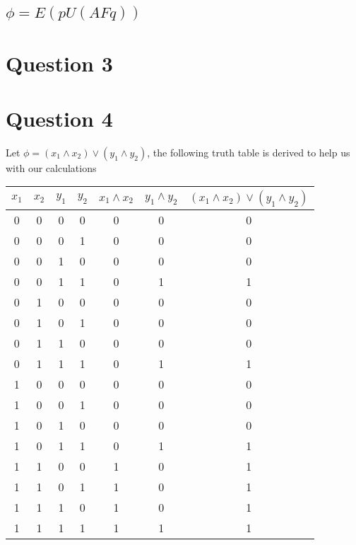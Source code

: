 \documentclass[a4paper,10pt]{article}
\begin{document}
\subsection*{$\phi = E(pU(AFq))$}






\newpage
\section*{Question 3}
\newpage
\section*{Question 4}
Let $\phi = (x_1 \wedge x_2) \vee (y_1 \wedge y_2) $, the following truth table is derived to help us with our calculations

\begin{center}
 
\begin{tabular}{|c|c|c|c|c|c|c|}
\hline
$x_1$ & $x_2$ & $y_1$ & $y_2$ & $x_1 \wedge x_2 $ & $y_1 \wedge y_2$ & $(x_1 \wedge x_2) \vee (y_1 \wedge y_2)$ \\
\hline
0 & 0 & 0 & 0 & 0 & 0 & 0 \\
0 & 0 & 0 & 1 & 0 & 0 & 0 \\
0 & 0 & 1 & 0 & 0 & 0 & 0 \\
0 & 0 & 1 & 1 & 0 & 1 & 1 \\
0 & 1 & 0 & 0 & 0 & 0 & 0 \\
0 & 1 & 0 & 1 & 0 & 0 & 0 \\
0 & 1 & 1 & 0 & 0 & 0 & 0 \\
0 & 1 & 1 & 1 & 0 & 1 & 1 \\
1 & 0 & 0 & 0 & 0 & 0 & 0 \\
1 & 0 & 0 & 1 & 0 & 0 & 0 \\
1 & 0 & 1 & 0 & 0 & 0 & 0 \\
1 & 0 & 1 & 1 & 0 & 1 & 1 \\
1 & 1 & 0 & 0 & 1 & 0 & 1 \\
1 & 1 & 0 & 1 & 1 & 0 & 1 \\
1 & 1 & 1 & 0 & 1 & 0 & 1 \\
1 & 1 & 1 & 1 & 1 & 1 & 1 \\

\hline
\end{tabular}

\end{center}
\end{document}

